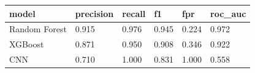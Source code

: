\begin{tabular}{llllll}
\toprule
model & precision & recall & f1 & fpr & roc_auc \\
\midrule
Random Forest & 0.915 & 0.976 & 0.945 & 0.224 & 0.972 \\
XGBoost & 0.871 & 0.950 & 0.908 & 0.346 & 0.922 \\
CNN & 0.710 & 1.000 & 0.831 & 1.000 & 0.558 \\
\bottomrule
\end{tabular}
